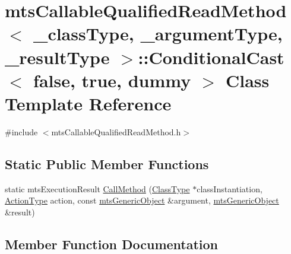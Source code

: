 \hypertarget{classmts_callable_qualified_read_method_1_1_conditional_cast_3_01false_00_01true_00_01dummy_01_4}{}\section{mts\+Callable\+Qualified\+Read\+Method$<$ \+\_\+class\+Type, \+\_\+argument\+Type, \+\_\+result\+Type $>$\+:\+:Conditional\+Cast$<$ false, true, dummy $>$ Class Template Reference}
\label{classmts_callable_qualified_read_method_1_1_conditional_cast_3_01false_00_01true_00_01dummy_01_4}


{\ttfamily \#include $<$mts\+Callable\+Qualified\+Read\+Method.\+h$>$}

\subsection*{Static Public Member Functions}
\begin{DoxyCompactItemize}
\item 
static mts\+Execution\+Result \hyperlink{classmts_callable_qualified_read_method_1_1_conditional_cast_3_01false_00_01true_00_01dummy_01_4_ae07239189a99998b02b7959194128ebe}{Call\+Method} (\hyperlink{classmts_callable_qualified_read_method_a6cfee5c3c3c49c691c2f5176ea79d735}{Class\+Type} $\ast$class\+Instantiation, \hyperlink{classmts_callable_qualified_read_method_a6327de6d1017295be394178d8e03b121}{Action\+Type} action, const \hyperlink{classmts_generic_object}{mts\+Generic\+Object} \&argument, \hyperlink{classmts_generic_object}{mts\+Generic\+Object} \&result)
\end{DoxyCompactItemize}


\subsection{Member Function Documentation}
\hypertarget{classmts_callable_qualified_read_method_1_1_conditional_cast_3_01false_00_01true_00_01dummy_01_4_ae07239189a99998b02b7959194128ebe}{}
